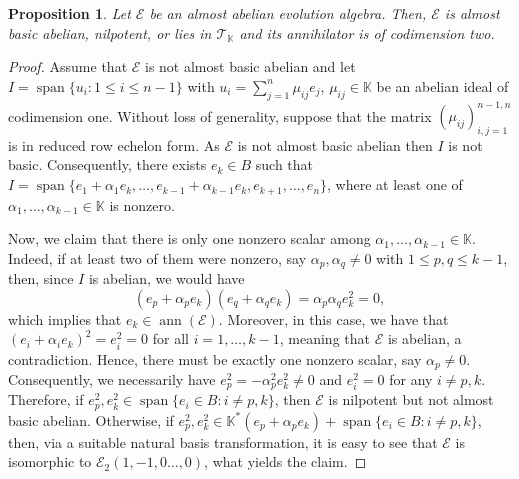 \documentclass[12pt,reqno]{amsart}
\newtheorem{proposition}[theorem]{Proposition}
\theoremstyle{definition}
\theoremstyle{remark}
\DeclareMathOperator{\ann}{ann}
\DeclareMathOperator{\spa}{span}
\numberwithin{equation}{section}
\begin{document}
\begin{proposition}\label{prop:char_aa}
	Let $\mathcal{E}$ be an almost abelian evolution algebra. Then, $\mathcal{E}$ is almost basic abelian, nilpotent, or lies in $\mathcal{T}_\mathbb{K}$ and its annihilator is of codimension two.
\end{proposition}
\begin{proof}
Assume that $\mathcal{E}$ is not almost basic abelian and let $I=\spa\{u_i\colon 1\leq i\leq n-1\}$ with $u_i=\sum_{j=1}^{n}\mu_{ij}e_j$, $\mu_{ij}\in\mathbb{K}$ be an abelian ideal of codimension one. Without loss of generality, suppose that the matrix $(\mu_{ij})_{i,j=1}^{n-1,n}$ is in reduced row echelon form. As $\mathcal{E}$ is not almost basic abelian then $I$ is not basic. Consequently, there exists $e_k\in B$  such that $I=\spa\{e_1+\alpha_1e_k,\dots,e_{k-1}+\alpha_{k-1}e_k,e_{k+1},\dots,e_n\}$, where at least one of $\alpha_1,\dots,\alpha_{k-1}\in\mathbb{K}$ is nonzero.

Now, we claim that there is only one nonzero scalar among $\alpha_1,\dots,\alpha_{k-1}\in\mathbb{K}$. Indeed, if at least two of them were nonzero, say $\alpha_p,\alpha_q\neq0$ with $1\leq p,q\leq k-1$, then, since $I$ is abelian, we would have $$(e_p+\alpha_pe_k)(e_q+\alpha_qe_k)=\alpha_p\alpha_qe_k^2=0,$$ which implies that $e_k\in\ann(\mathcal{E})$.
Moreover, in this case, we have that $(e_i+\alpha_ie_k)^2=e_i^2=0$ for all $i=1,\dots,k-1$, meaning that $\mathcal{E}$ is abelian, a contradiction. Hence, there must be exactly one nonzero scalar, say $\alpha_p\neq0$. Consequently, we necessarily have $e_p^2=-\alpha_p^2e_k^2\neq0$ and $e_i^2=0$ for any $i\neq p,k$. Therefore, if $e_p^2,e_k^2\in\spa\{e_i\in B\colon i\neq p,k\}$, then $\mathcal{E}$ is nilpotent but not almost basic abelian. Otherwise, if $e_p^2,e_k^2\in\mathbb{K}^*(e_p+\alpha_pe_k)+\spa\{e_i\in B\colon i\neq p,k\}$, then, via a suitable natural basis transformation, it is easy to see that $\mathcal{E}$ is isomorphic to $\mathcal{E}_2(1,-1,0\dots,0)$, what yields the claim.
\end{proof}
\end{document}
